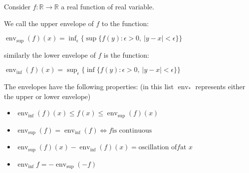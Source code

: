 \documentclass[12pt]{article}
\DeclareMathOperator{\env}{env}
\begin{document}
Consider $f:\mathbb{R} \to \mathbb{R}$ a real function of real variable.

We call the upper envelope of $f$ to the function:

$\env_{\sup}(f)(x) = \inf_{\epsilon} \{\sup \{ f(y): \epsilon>0,\: |y-x|<\epsilon \}\}$

similarly the lower envelope of $f$ is the function:

$\env_{\inf}(f)(x) = \sup_{\epsilon} \{\inf \{ f(y): \epsilon>0,\: |y-x|<\epsilon \}\}$

The envelopes have the following properties:
(in this list $\env_\ast$ represents either the upper or lower envelope)

\begin{itemize}
\item $ \env_{\inf}(f)(x) \le f(x) \le \env_{\sup}(f)(x)$
\item $ \env_{\sup}(f) = \env_{\inf}(f) \iff f \text{is continuous} $
\item $ \env_{\sup}(f)(x) - \env_{\inf}(f)(x) = \text{oscillation of} f \text{at } x$
\item $\env_{\inf} f = - \env_{\sup}(-f)$
\end{itemize}
\end{document}
